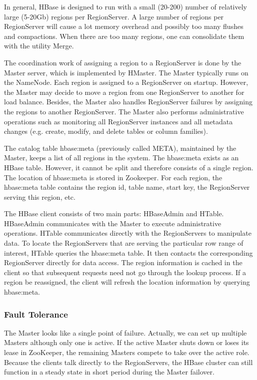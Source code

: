 \documentclass[11pt]{book}
\begin{document}
In general, HBase is designed to run with a small (20-200) number of relatively large (5-20Gb) regions per RegionServer. A large number of regions per RegionServer will cause a lot memory overhead and possibly too many flushes and compactions. When there are too many regions, one can consolidate them with the utility Merge.

The coordination work of assigning a region to a RegionServer is done by the Master server, which is implemented by HMaster. The Master typically runs on the NameNode. Each region is assigned to a RegionServer on startup. However, the Master may decide to move a region from one RegionServer to another for load balance. Besides, the Master also handles RegionServer failures by assigning the regions to another RegionServer.  The Master also performs administrative operations such as monitoring all RegionServer instances and all metadata changes (e.g. create, modify, and delete tables or column families).

The catalog table hbase:meta (previously called META), maintained by the Master, keeps a list of all regions in the system. The hbase:meta exists as an HBase table. However, it cannot be split and therefore consists of a single region. The location of hbase:meta is stored in Zookeeper. For each region, the hbase:meta table contains the region id, table name, start key, the RegionServer serving this region, etc.

The HBase client consists of two main parts: HBaseAdmin and HTable. HBaseAdmin communicates with the Master to execute administrative operations. HTable communicates directly with the RegionServers to manipulate data. To locate the RegionServers that are serving the particular row range of interest, HTable queries the hbase:meta table. It then contacts the corresponding RegionServer directly for data access. The region information is cached in the client so that subsequent requests need not go through the lookup process. If a region be reassigned, the client will refresh the location information by querying hbase:meta.

\subsubsection{Fault Tolerance}

The Master looks like a single point of failure. Actually, we can set up multiple Masters although only one is active. If the active Master shuts down or loses its lease in ZooKeeper, the remaining Masters compete to take over the active role. Because the clients talk directly to the RegionServers, the HBase cluster can still function in a steady state in short period during the Master failover.
\end{document}
